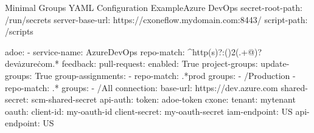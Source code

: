 \begin{code}{Minimal Groups YAML Configuration Example}{Azure DevOps}{}
  secret-root-path: /run/secrets
  server-base-url: https://cxoneflow.mydomain.com:8443/
  script-path: /scripts

  adoe:
      - service-name: AzureDevOps
        repo-match: ^http(s)?:(\/){2}(.+@)?dev\.azure\.com.*
        feedback:
          pull-request:
            enabled: True
        project-groups:
          update-groups: True
          group-assignments:
            - repo-match: .*prod
              groups:
                - /Production
            - repo-match: .*
              groups:
                - /All
        connection:
          base-url: https://dev.azure.com
          shared-secret: scm-shared-secret
          api-auth:
            token: adoe-token
        cxone:
          tenant: mytenant
          oauth:
            client-id: my-oauth-id
            client-secret: my-oauth-secret
          iam-endpoint: US
          api-endpoint: US
\end{code}
    